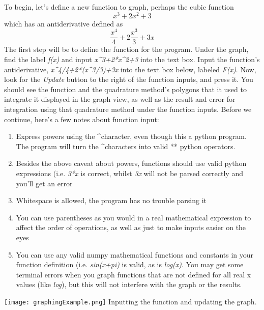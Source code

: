 \documentclass[12pt]{article}
\newcommand{\newLine}{\vspace{5mm}}
\begin{document}
\newLine To begin, let's define a new function to graph, perhaps the cubic function \begin{equation*}
	x^3 + 2x^2 + 3
\end{equation*} which has an antiderivative defined as
\begin{equation*}
	\frac{x^4}{4} + 2\frac{x^3}{3} + 3x
\end{equation*}
The first step will be to define the function for the program. Under the graph, find the label \emph{f(x)} and input \emph{x\textasciicircum 3+2*x\textasciicircum 2+3} into the text box. Input the function's antiderivative, \emph{x\textasciicircum 4/4+2*(x\textasciicircum 3/3)+3x} into the text box below, labeled \emph{F(x)}. Now, look for the \emph{Update} button to the right of the function inputs, and press it. You should see the function and the quadrature method's polygons that it used to integrate it displayed in the graph view, as well as the result and error for integration using that quadrature method under the function inputs. Before we continue, here's a few notes about function input:
\begin{enumerate}[\indent 1.]
\item Express powers using the \textasciicircum character, even though this a python program. The program will turn the \textasciicircum characters into valid ** python operators.
\item Besides the above caveat about powers, functions should use valid python expressions (i.e. \emph{3*x} is correct, whilst \emph{3x} will not be parsed correctly and you'll get an error
\item Whitespace is allowed, the program has no trouble parsing it
\item You can use parentheses as you would in a real mathematical expression to affect the order of operations, as well as just to make inputs easier on the eyes
\item You can use any valid numpy mathematical functions and constants in your function definition (i.e. \emph{sin(x+pi)} is valid, as is \emph{log(x)}. You may get some terminal errors when you graph functions that are not defined for all real x values (like \emph{log}), but this will not interfere with the graph or the results.
\end{enumerate}

\begin{center}
\texttt{[image: graphingExample.png]}
\small Inputting the function and updating the graph.
\normalsize
\end{center}
\end{document}
